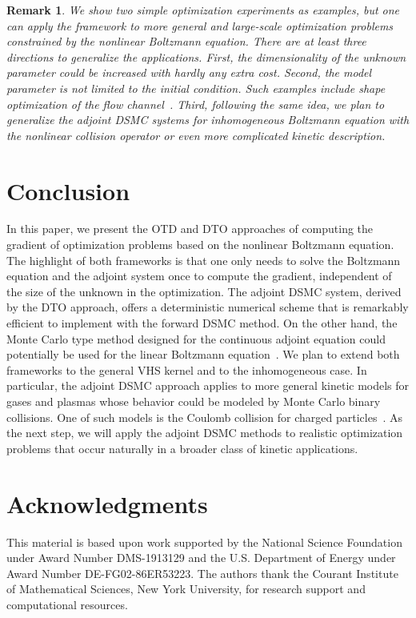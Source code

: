 \documentclass[times,final,nopreprintline]{elsarticle}
\newtheorem{remark}{Remark}
\begin{document}
\begin{remark}
We show two simple optimization experiments as examples, but one can apply the framework to more general and large-scale optimization problems constrained by the nonlinear Boltzmann equation. There are at least three directions to generalize the applications. First, the dimensionality of the unknown parameter could be increased with hardly any extra cost. Second, the model parameter is not limited to the initial condition. Such examples include shape optimization of the flow channel~\cite{sato2019topology}. Third, following the same idea, we plan to generalize the adjoint DSMC systems for inhomogeneous Boltzmann equation with the nonlinear collision operator or even more complicated kinetic description.
\end{remark}





\section{Conclusion}\label{sec:conclusion}
In this paper, we present the OTD and DTO approaches of computing the gradient of optimization problems based on the nonlinear Boltzmann equation. The highlight of both frameworks is that one only needs to solve the Boltzmann equation and the adjoint system once to compute the gradient, independent of the size of the unknown in the optimization. The adjoint DSMC system, derived by the DTO approach, offers a deterministic numerical scheme that is remarkably efficient to implement with the forward DSMC method. On the other hand, the Monte Carlo type method designed for the continuous adjoint equation could potentially be used for the linear Boltzmann equation~\cite{bobylev2008some}. We plan to extend both frameworks to the general VHS kernel and to the inhomogeneous case. In particular, the adjoint DSMC approach applies to more general kinetic models for gases and plasmas whose behavior could be modeled by Monte Carlo binary collisions. One of such models is the Coulomb collision for charged particles~\cite{wang2008particle}. As the next step, we will apply the adjoint DSMC methods to realistic optimization problems that occur naturally in a broader class of kinetic applications. 

\section*{Acknowledgments}
This material is based upon work supported by the National Science Foundation under Award Number DMS-1913129 and the U.S. Department of Energy under Award Number DE-FG02-86ER53223. The authors thank the Courant Institute of Mathematical Sciences, New York University, for research support and computational resources.
\end{document}
